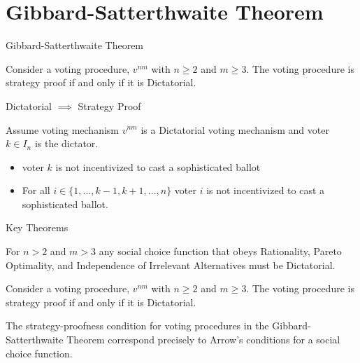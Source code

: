 \documentclass{beamer}
\begin{document}
\section{Gibbard-Satterthwaite Theorem}

\begin{frame}{Gibbard-Satterthwaite Theorem}

\begin{theorem}
    Consider a voting procedure, $v^{nm}$ with $n \ge 2$ and $m \ge 3$. The voting procedure is strategy proof if and only if it is Dictatorial. 
\end{theorem}
    
\end{frame}

\begin{frame}{Dictatorial $\implies$ Strategy Proof}

Assume voting mechanism $v^{nm}$ is a Dictatorial voting mechanism and voter $k \in I_n$ is the dictator.

\begin{itemize}
    \item voter $k$ is not incentivized to cast a sophisticated ballot
    \item For all $i \in \{1, ... , k-1, k+1, ... , n \}$ voter $i$ is not incentivized to cast a sophisticated ballot.
\end{itemize}
\end{frame}

\begin{frame}{Key Theorems}
    \begin{theorem}
    For $n > 2$ and $m > 3$ any social choice function that obeys Rationality, Pareto Optimality, and Independence of Irrelevant Alternatives must be Dictatorial.
    \end{theorem}


\begin{theorem}
    Consider a voting procedure, $v^{nm}$ with $n \ge 2$ and $m \ge 3$. The voting procedure is strategy proof if and only if it is Dictatorial. 
\end{theorem}

\begin{theorem}
    The strategy-proofness condition for voting procedures in the Gibbard-Satterthwaite Theorem  correspond precisely to Arrow’s conditions for a social choice function. 
\end{theorem}
\end{frame}
\end{document}
